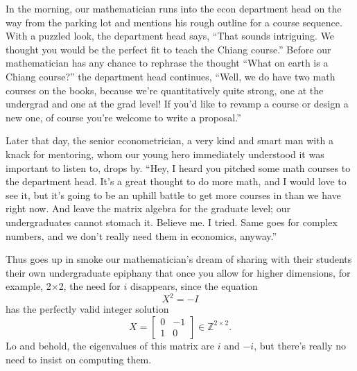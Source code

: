 \documentclass[10pt]{article}
\newcommand{\Z}{\mathds{Z}}
\begin{document}
In the morning, our mathematician runs into the econ department head on the way from the parking lot and mentions his rough outline for a course sequence. With a puzzled look, the department head says, ``That sounds intriguing. We thought you would be the perfect fit to teach the Chiang course.'' Before our mathematician has any chance to rephrase the thought ``What on earth is a Chiang course?'' the department head continues, ``Well, we do have two math courses on the books, because we're quantitatively quite strong, one at the undergrad and one at the grad level! If you'd like to revamp a course or design a new one, of course you're welcome to write a proposal.'' 

Later that day, the senior econometrician, a very kind and smart man with a knack for mentoring, whom our young hero immediately understood it was important to listen to, drops by. ``Hey, I heard you pitched some math courses to the department head. It's a great thought to do more math, and I would love to see it, but it's going to be an uphill battle to get more courses in than we have right now. And leave the matrix algebra for the graduate level; our undergraduates cannot stomach it. Believe me. I tried. Same goes for complex numbers, and we don't really need them in economics, anyway.'' \nocite{Chiang1984}

Thus goes up in smoke our mathematician’s dream of sharing with their students their own undergraduate epiphany that once you allow for higher dimensions, for example, 2$\times$2, the need for $i$ disappears, since the equation
\[
X^2 = -I
\]
has the perfectly valid integer solution
\[
X = \left[\begin{array}{cc}
0 & -1 \\ 1 & 0
\end{array}\right]\in\Z^{2\times 2}.
\]
Lo and behold, the eigenvalues of this matrix are $i$ and $-i$, but there's really no need to insist on computing them. 
\end{document}
